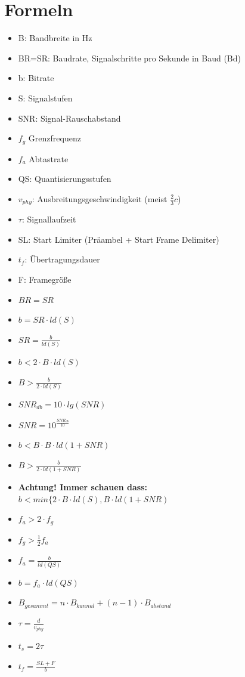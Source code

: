 \documentclass[12pt,a4paper]{article}
\begin{document}
\section{Formeln}
\begin{itemize}
\item B: Bandbreite in Hz
\item BR=SR: Baudrate, Signalschritte pro Sekunde in Baud (Bd)
\item b: Bitrate
\item S: Signalstufen
\item SNR: Signal-Rauschabstand
\item $f_g$ Grenzfrequenz
\item $f_a$ Abtastrate
\item QS: Quantisierungsstufen
\item $v_{phy}$: Ausbreitungsgeschwindigkeit (meist $\frac{2}{3}c$)
\item $\tau$: Signallaufzeit
\item SL: Start Limiter (Präambel + Start Frame Delimiter)
\item $t_f$: Übertragungsdauer
\item F: Framegröße
\item $BR=SR$
\item $b = SR \cdot ld(S)$
\item $SR = \frac{b}{ld(S)}$
\item $b < 2 \cdot B \cdot ld(S)$
\item $B > \frac{b}{2 \cdot ld(S)}$
\item $SNR_{db} = 10\cdot lg(SNR)$
\item $SNR = 10^{\frac{SNR_{db}}{10}}$
\item $b<B\cdot B \cdot ld(1+SNR)$
\item $B > \frac{b}{2 \cdot ld(1+SNR)}$
\item \textbf{Achtung! Immer schauen dass:}\\ $b<min\{2\cdot B \cdot ld(S), B \cdot ld(1+SNR)$
\item $f_a > 2 \cdot f_g$
\item $f_g > \frac{1}{2} f_a$
\item $f_a = \frac{b}{ld(QS)}$
\item $b = f_a \cdot ld(QS)$
\item $B_{gesammt} = n \cdot B_{kannal} + (n - 1) \cdot B_{abstand}$
\item $\tau = \frac{d}{v_{phy}}$
\item $t_s  = 2 \tau$
\item $t_f = \frac{SL+F}{b}$
\end{itemize}
\end{document}
